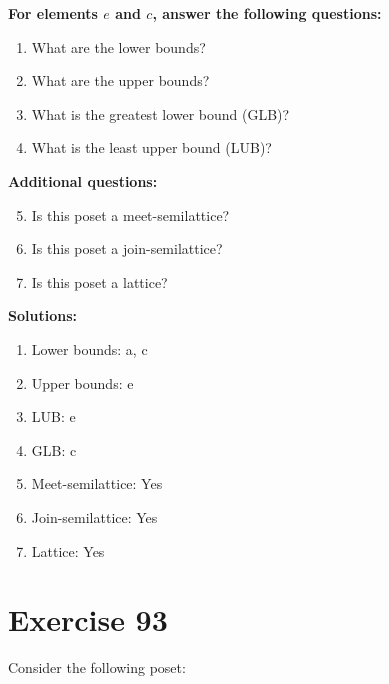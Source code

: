 \documentclass{article}
\begin{document}
    \textbf{For elements $e$ and $c$, answer the following questions:}
\begin{enumerate}
    \item What are the lower bounds?
    \item What are the upper bounds?
    \item What is the greatest lower bound (GLB)?
    \item What is the least upper bound (LUB)?
\end{enumerate}
    \hspace*{3ex} \textbf{Additional questions:}
\begin{enumerate}
    \setcounter{enumi}{4}
    \item Is this poset a meet-semilattice?
    \item Is this poset a join-semilattice?
    \item Is this poset a lattice?
\end{enumerate}

\textbf{Solutions:}
\begin{enumerate}
    \item Lower bounds: {a, c}
    \item Upper bounds: {e}
    \item LUB: e
    \item GLB: c
    \item Meet-semilattice: Yes
    \item Join-semilattice: Yes
    \item Lattice: Yes
\end{enumerate}
\newpage
\section*{Exercise 93}
Consider the following poset:
\begin{center}
\end{center}
\end{document}
